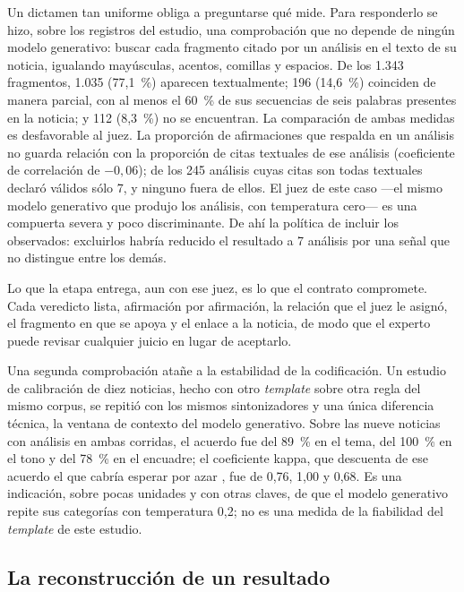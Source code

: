 \documentclass[12pt]{report}
\begin{document}
Un dictamen tan uniforme obliga a preguntarse qué mide. Para responderlo se hizo, sobre los registros del estudio, una comprobación que no depende de ningún modelo generativo: buscar cada fragmento citado por un análisis en el texto de su noticia, igualando mayúsculas, acentos, comillas y espacios. De los 1.343 fragmentos, 1.035 (77,1~\%) aparecen textualmente; 196 (14,6~\%) coinciden de manera parcial, con al menos el 60~\% de sus secuencias de seis palabras presentes en la noticia; y 112 (8,3~\%) no se encuentran. La comparación de ambas medidas es desfavorable al juez. La proporción de afirmaciones que respalda en un análisis no guarda relación con la proporción de citas textuales de ese análisis (coeficiente de correlación de \(-0{,}06\)); de los 245 análisis cuyas citas son todas textuales declaró válidos sólo 7, y ninguno fuera de ellos. El juez de este caso ---el mismo modelo generativo que produjo los análisis, con temperatura cero--- es una compuerta severa y poco discriminante. De ahí la política de incluir los observados: excluirlos habría reducido el resultado a 7 análisis por una señal que no distingue entre los demás.

Lo que la etapa entrega, aun con ese juez, es lo que el contrato compromete. Cada veredicto lista, afirmación por afirmación, la relación que el juez le asignó, el fragmento en que se apoya y el enlace a la noticia, de modo que el experto puede revisar cualquier juicio en lugar de aceptarlo.

Una segunda comprobación atañe a la estabilidad de la codificación. Un estudio de calibración de diez noticias, hecho con otro \textit{template} sobre otra regla del mismo corpus, se repitió con los mismos sintonizadores y una única diferencia técnica, la ventana de contexto del modelo generativo. Sobre las nueve noticias con análisis en ambas corridas, el acuerdo fue del 89~\% en el tema, del 100~\% en el tono y del 78~\% en el encuadre; el coeficiente kappa, que descuenta de ese acuerdo el que cabría esperar por azar \citep{cohen:1960}, fue de 0,76, 1,00 y 0,68. Es una indicación, sobre pocas unidades y con otras claves, de que el modelo generativo repite sus categorías con temperatura 0,2; no es una medida de la fiabilidad del \textit{template} de este estudio.

\subsection{La reconstrucción de un resultado}
\label{sec:ej-res-procedencia}
\end{document}
